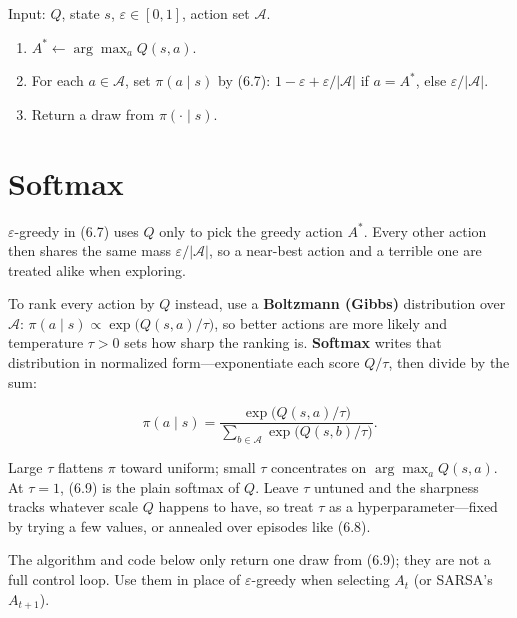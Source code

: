 \begin{implnote}
Input: $Q$, state $s$, $\varepsilon\in[0,1]$, action set $\mathcal{A}$.

\begin{enumerate}
\item $A^*\leftarrow\arg\max_a Q(s,a)$.
\item For each $a\in\mathcal{A}$, set $\pi(a\mid s)$ by (6.7): $1-\varepsilon+\varepsilon/\lvert\mathcal{A}\rvert$ if $a=A^*$, else $\varepsilon/\lvert\mathcal{A}\rvert$.
\item Return a draw from $\pi(\cdot\mid s)$.
\end{enumerate}

\end{implnote}




\section{Softmax}

$\varepsilon$-greedy in (6.7) uses $Q$ only to pick the greedy action $A^*$. Every other action then shares the same mass $\varepsilon/\lvert\mathcal{A}\rvert$, so a near-best action and a terrible one are treated alike when exploring.

To rank every action by $Q$ instead, use a \textbf{Boltzmann (Gibbs)} distribution over $\mathcal{A}$: $\pi(a\mid s)\propto\exp\bigl(Q(s,a)/\tau\bigr)$, so better actions are more likely and temperature $\tau>0$ sets how sharp the ranking is. \textbf{Softmax} writes that distribution in normalized form---exponentiate each score $Q/\tau$, then divide by the sum:

\begin{equation}
\pi(a\mid s)
=
\frac{\exp\bigl(Q(s,a)/\tau\bigr)}
{\sum_{b\in\mathcal{A}}\exp\bigl(Q(s,b)/\tau\bigr)}.
\tag{6.9}
\end{equation}

Large $\tau$ flattens $\pi$ toward uniform; small $\tau$ concentrates on $\arg\max_a Q(s,a)$. At $\tau=1$, (6.9) is the plain softmax of $Q$. Leave $\tau$ untuned and the sharpness tracks whatever scale $Q$ happens to have, so treat $\tau$ as a hyperparameter---fixed by trying a few values, or annealed over episodes like (6.8).

The algorithm and code below only return one draw from (6.9); they are not a full control loop. Use them in place of $\varepsilon$-greedy when selecting $A_t$ (or SARSA's $A_{t+1}$).

